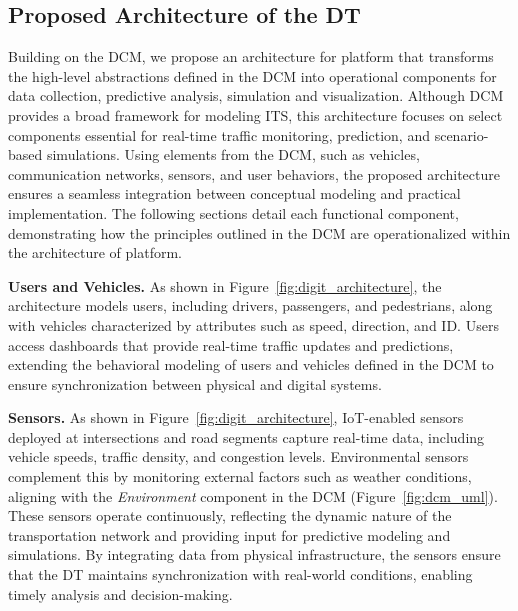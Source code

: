 


\subsection{Proposed Architecture of the DT}  
Building on the DCM, we propose an architecture for \digit platform that transforms the high-level abstractions defined in the DCM into operational components for data collection, predictive analysis, simulation and visualization. Although DCM provides a broad framework for modeling ITS, this architecture focuses on select components essential for real-time traffic monitoring, prediction, and scenario-based simulations. Using elements from the DCM, such as vehicles, communication networks, sensors, and user behaviors, the proposed architecture ensures a seamless integration between conceptual modeling and practical implementation. The following sections detail each functional component, demonstrating how the principles outlined in the DCM are operationalized within the architecture of \digit platform.


\textbf{Users and Vehicles.}  
As shown in Figure~\ref{fig:digit_architecture}, the architecture models users, including drivers, passengers, and pedestrians, along with vehicles characterized by attributes such as speed, direction, and ID. Users access dashboards that provide real-time traffic updates and predictions, extending the behavioral modeling of users and vehicles defined in the DCM to ensure synchronization between physical and digital systems.



\textbf{Sensors.}  
As shown in Figure~\ref{fig:digit_architecture}, IoT-enabled sensors deployed at intersections and road segments capture real-time data, including vehicle speeds, traffic density, and congestion levels. Environmental sensors complement this by monitoring external factors such as weather conditions, aligning with the \textit{Environment} component in the DCM (Figure~\ref{fig:dcm_uml}). These sensors operate continuously, reflecting the dynamic nature of the transportation network and providing input for predictive modeling and simulations. By integrating data from physical infrastructure, the sensors ensure that the DT maintains synchronization with real-world conditions, enabling timely analysis and decision-making.


